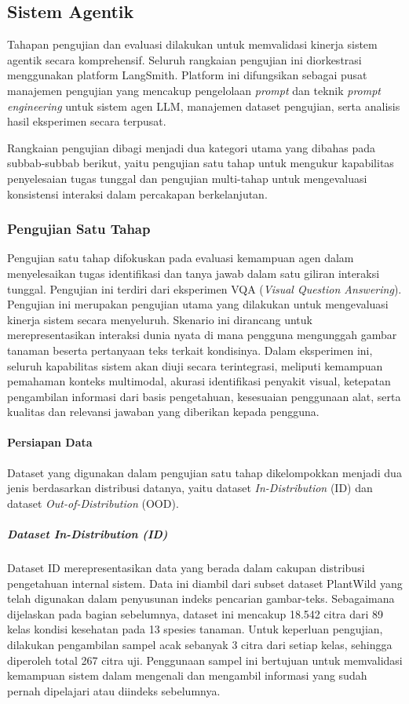 \subsection{Sistem Agentik}
Tahapan pengujian dan evaluasi dilakukan untuk memvalidasi kinerja sistem agentik secara komprehensif. Seluruh rangkaian pengujian ini diorkestrasi menggunakan platform LangSmith. Platform ini difungsikan sebagai pusat manajemen pengujian yang mencakup pengelolaan \textit{prompt} dan teknik \textit{prompt engineering} untuk sistem agen LLM, manajemen dataset pengujian, serta analisis hasil eksperimen secara terpusat.

Rangkaian pengujian dibagi menjadi dua kategori utama yang dibahas pada subbab-subbab berikut, yaitu pengujian satu tahap untuk mengukur kapabilitas penyelesaian tugas tunggal dan pengujian multi-tahap untuk mengevaluasi konsistensi interaksi dalam percakapan berkelanjutan.

\subsubsection{Pengujian Satu Tahap}
Pengujian satu tahap difokuskan pada evaluasi kemampuan agen dalam menyelesaikan tugas identifikasi dan tanya jawab dalam satu giliran interaksi tunggal. Pengujian ini terdiri dari eksperimen VQA (\textit{Visual Question Answering}). Pengujian ini merupakan pengujian utama yang dilakukan untuk mengevaluasi kinerja sistem secara menyeluruh. Skenario ini dirancang untuk merepresentasikan interaksi dunia nyata di mana pengguna mengunggah gambar tanaman beserta pertanyaan teks terkait kondisinya. Dalam eksperimen ini, seluruh kapabilitas sistem akan diuji secara terintegrasi, meliputi kemampuan pemahaman konteks multimodal, akurasi identifikasi penyakit visual, ketepatan pengambilan informasi dari basis pengetahuan, kesesuaian penggunaan alat, serta kualitas dan relevansi jawaban yang diberikan kepada pengguna.

\paragraph{Persiapan Data}
Dataset yang digunakan dalam pengujian satu tahap dikelompokkan menjadi dua jenis berdasarkan distribusi datanya, yaitu dataset \textit{In-Distribution} (ID) dan dataset \textit{Out-of-Distribution} (OOD).

\subparagraph{\textit{Dataset In-Distribution} (ID)}
Dataset ID merepresentasikan data yang berada dalam cakupan distribusi pengetahuan internal sistem. Data ini diambil dari subset dataset PlantWild yang telah digunakan dalam penyusunan indeks pencarian gambar-teks. Sebagaimana dijelaskan pada bagian sebelumnya, dataset ini mencakup 18.542 citra dari 89 kelas kondisi kesehatan pada 13 spesies tanaman. Untuk keperluan pengujian, dilakukan pengambilan sampel acak sebanyak 3 citra dari setiap kelas, sehingga diperoleh total 267 citra uji. Penggunaan sampel ini bertujuan untuk memvalidasi kemampuan sistem dalam mengenali dan mengambil informasi yang sudah pernah dipelajari atau diindeks sebelumnya.

